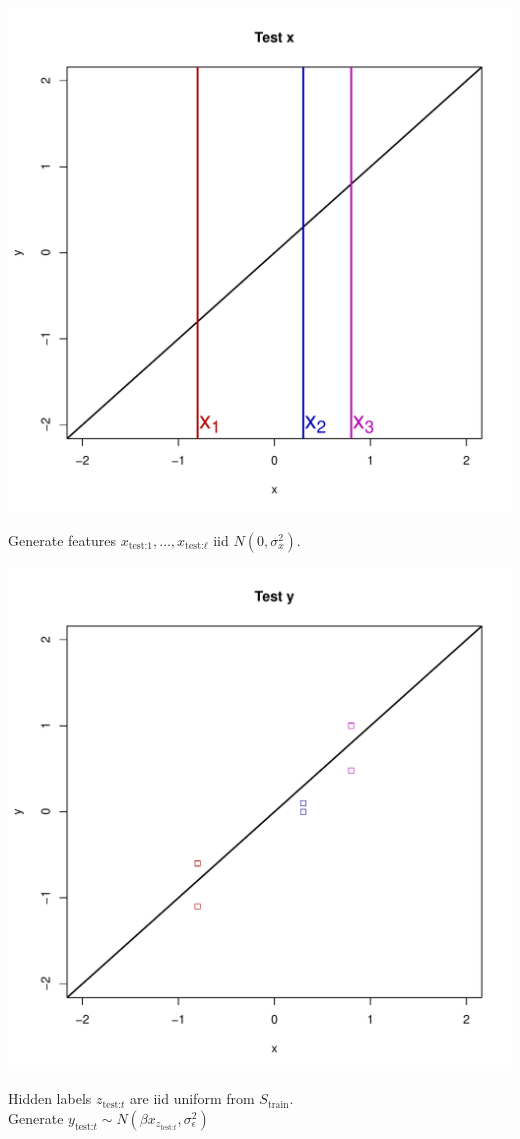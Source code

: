 \documentclass{beamer}
\begin{document}
\begin{frame}
\begin{center}
\includegraphics[scale = 0.4]{ti2.pdf}
\end{center}
Generate features $x_{\text{test:} 1}, \hdots, x_{\text{test:} \ell}$ iid $N(0, \sigma^2_x)$.
\end{frame}

\begin{frame}
\begin{center}
\includegraphics[scale = 0.4]{ti3.pdf}
\end{center}
Hidden labels $z_{\text{test:} t}$ are iid uniform from $S_{\text{train}}$.\\
Generate $y_{\text{test:} t} \sim N(\beta x_{z_{\text{test:} t}}, \sigma^2_\epsilon)$
\end{frame}
\end{document}
